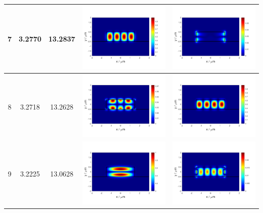 \documentclass{assignment}
\begin{document}
\begin{sol}
\begin{itemize}
\begin{longtable}[c]{|c|c|c|c|c|}
            7 & 3.2770 & 13.2837 & \includegraphics[width=.3\columnwidth]{Assignment-2-mode-7-Ex.png} & \includegraphics[width=.3\columnwidth]{Assignment-2-mode-7-Ey.png} \\ \hline
            8 & 3.2718 & 13.2628 & \includegraphics[width=.3\columnwidth]{Assignment-2-mode-8-Ex.png} & \includegraphics[width=.3\columnwidth]{Assignment-2-mode-8-Ey.png} \\ \hline
            9 & 3.2225 & 13.0628 & \includegraphics[width=.3\columnwidth]{Assignment-2-mode-9-Ex.png} & \includegraphics[width=.3\columnwidth]{Assignment-2-mode-9-Ey.png} \\ \hline

\end{longtable}
\end{itemize}
\end{sol}
\end{document}
